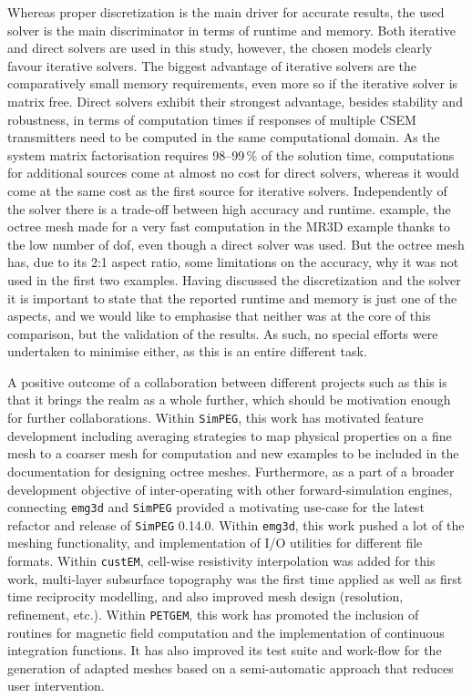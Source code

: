 \documentclass[extra, camera,%
]{gji}
\newcommand{\emg}[2]{\texttt{emg#1#2}\xspace}
\newcommand{\simpeg}{\texttt{SimPEG}\xspace}
\newcommand{\custem}{\texttt{custEM}\xspace}
\newcommand{\petgem}{\texttt{PETGEM}\xspace}
\begin{document}
Whereas proper discretization is the main driver for accurate results, the used solver is the main discriminator in terms of runtime and memory. Both iterative and direct solvers are used in this study, however, the chosen models clearly favour iterative solvers. The biggest advantage of iterative solvers are the comparatively small memory requirements, even more so if the iterative solver is matrix free. Direct solvers exhibit their strongest advantage, besides stability and robustness, in terms of computation times if responses of multiple CSEM transmitters need to be computed in the same computational domain. As the system matrix factorisation requires 98--99\,\% of the solution time, computations for additional sources come at almost no cost for direct solvers, whereas it would come at the same cost as the first source for iterative solvers. Independently of the solver there is a trade-off between high accuracy and runtime.  example, the octree mesh made for a very fast computation in the MR3D example thanks to the low number of dof, even though a direct solver was used. But the octree mesh has, due to its 2:1 aspect ratio, some limitations on the accuracy, why it was not used in the first two examples. Having discussed the discretization and the solver it is important to state that the reported runtime and memory is just one of the aspects, and we would like to emphasise that neither was at the core of this comparison, but the validation of the results. As such, no special efforts were undertaken to minimise either, as this is an entire different task.

A positive outcome of a collaboration between different projects such as this is that it brings the realm as a whole further, which should be motivation enough for further collaborations. Within \simpeg, this work has motivated feature development including averaging strategies to map physical properties on a fine mesh to a coarser mesh for computation and new examples to be included in the documentation for designing octree meshes. Furthermore, as a part of a broader development objective of inter-operating with other forward-simulation engines, connecting \emg3d and \simpeg provided a motivating use-case for the latest refactor and release of \simpeg 0.14.0. Within \emg3d, this work pushed a lot of the meshing functionality, and implementation of I/O utilities for different file formats. Within \custem, cell-wise resistivity interpolation was added for this work, multi-layer subsurface topography was the first time applied as well as first time reciprocity modelling, and also improved mesh design (resolution, refinement, etc.). Within \petgem, this work has promoted the inclusion of routines for magnetic field computation and the implementation of continuous integration functions. It has also improved its test suite and work-flow for the generation of adapted meshes based on a semi-automatic approach that reduces user intervention.
\end{document}
